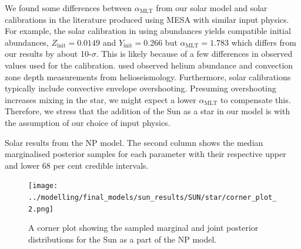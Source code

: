 \documentclass[a4paper,fleqn,usenatbib]{mnras}
\newcommand{\mlt}{\ensuremath{{\alpha_\mathrm{MLT}}}}
\begin{document}
We found some differences between $\mlt$ from our solar model and solar calibrations in the literature produced using \textsc{MESA} with similar input physics. For example, the solar calibration in \citet{Stancliffe.Fossati.ea2016} using \citet{Asplund.Grevesse.ea2009} abundances yields compatible initial abundances, $Z_\mathrm{init} = 0.0149$ and $Y_\mathrm{init} = 0.266$ but $\mlt = 1.783$ which differs from our results by about 10-$\sigma$. This is likely because of a few differences in observed values used for the calibration. \citet{Stancliffe.Fossati.ea2016} used observed helium abundance and convection zone depth measurements from helioseismology. Furthermore, solar calibrations typically include convective envelope overshooting. Presuming overshooting increases mixing in the star, we might expect a lower $\mlt$ to compensate this. Therefore, we stress that the addition of the Sun as a star in our model is with the assumption of our choice of input physics.

\begin{table}
    \centering
    \caption{Solar results from the NP model. The second column shows the median marginalised posterior samples for each parameter with their respective upper and lower 68 per cent credible intervals.}
    \label{tab:sun-out}
    
\end{table}

\begin{figure}
    \centering
    \texttt{[image: ../modelling/final\_models/sun\_results/SUN/star/corner\_plot\_2.png]}
    \caption{A corner plot showing the sampled marginal and joint posterior distributions for the Sun as a part of the NP model.}
    \label{fig:sun-results}
\end{figure}



\bsp	%
\label{lastpage}
\end{document}
